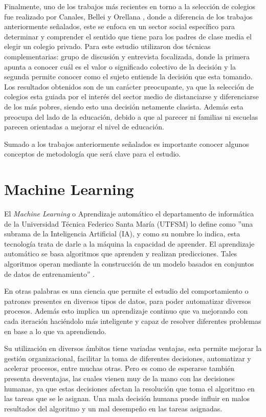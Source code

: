 Finalmente, uno de los trabajos más recientes en torno a la selección de colegios fue realizado por Canales, Bellei y Orellana \cite{canalesque}, donde a diferencia de los trabajos anteriormente señalados, este se enfoca en un sector social específico para determinar y comprender el sentido que tiene para los padres de clase media el elegir un colegio privado. Para este estudio utilizaron dos técnicas complementarias: grupo de discusión y entrevista focalizada, donde la primera apunta a conocer cuál es el valor o significado colectivo de la decisión y la segunda permite conocer como el sujeto entiende la decisión que esta tomando. Los resultados obtenidos son de un carácter preocupante, ya que la selección de colegios esta guiada por el interés del sector medio de distanciarse y diferenciarse de los más pobres, siendo esto una decisión netamente clasista. Además esta preocupa del lado de la educación, debido a que al parecer ni familias ni escuelas parecen orientadas a mejorar el nivel de educación.

Sumado a los trabajos anteriormente señalados es importante conocer algunos conceptos de metodología que será clave para el estudio.

\section{Machine Learning}

El \textit{Machine Learning} o Aprendizaje automático el departamento de informática de la Universidad Técnica Federico Santa María (UTFSM) lo define como ''una subrama de la Inteligencia Artificial (IA), y como su nombre lo indica, esta tecnología trata de darle a la máquina la capacidad de aprender. El aprendizaje automático se basa algoritmos que aprenden y realizan predicciones. Tales algoritmos operan mediante la construcción de un modelo basados en conjuntos de datos de entrenamiento'' \cite{machinelearningUTFSM}.

En otras palabras es una ciencia que permite el estudio del comportamiento o patrones presentes en diversos tipos de datos, para poder automatizar diversos procesos. Además esto implica un aprendizaje continuo que va mejorando con cada iteración haciéndolo más inteligente y capaz de resolver diferentes problemas en base a lo que va aprendiendo.

Su utilización en diversos ámbitos tiene variadas ventajas, esta permite mejorar la gestión organizacional, facilitar la toma de diferentes decisiones, automatizar y acelerar procesos, entre muchas otras. Pero es como de esperarse también presenta desventajas, las cuales vienen muy de la mano con las decisiones humanas, ya que estas decisiones afectan la resolución que toma el algoritmo en las tareas que se le asignan. Una mala decisión humana puede influir en malos resultados del algoritmo y un mal desempeño en las tareas asignadas.

